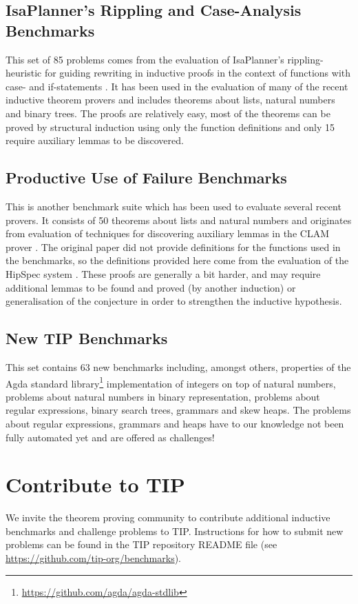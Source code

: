 \documentclass{llncs}
\begin{document}
\subsection{IsaPlanner's Rippling and Case-Analysis Benchmarks}
\label{sec:isap}
This set of 85 problems comes from the evaluation of IsaPlanner's rippling-heuristic for guiding rewriting in inductive proofs in the context of functions with case- and if-statements \cite{IsaPcase}. It has been used in the evaluation of many of the recent inductive theorem provers and includes theorems about lists, natural numbers and binary trees. The proofs are relatively easy, most of the theorems can be proved by structural induction using only the function definitions and only 15 require auxiliary lemmas to be discovered.

\subsection{Productive Use of Failure Benchmarks}
This is another benchmark suite which has been used to evaluate several recent provers. It consists of 50 theorems about lists and natural numbers and originates from evaluation of techniques for discovering auxiliary lemmas in the CLAM prover \cite{productiveuse}. The original paper did not provide definitions for the functions used in the benchmarks, so the definitions provided here come from the evaluation of the HipSpec system \cite{hipspecCADE}. These proofs are generally a bit harder, and may require additional lemmas to be found and proved (by another induction) or generalisation of the conjecture in order to strengthen the inductive hypothesis. 

\subsection{New TIP Benchmarks}
This set contains 63 new benchmarks including, amongst others,
properties of the Agda standard
library\footnote{\url{https://github.com/agda/agda-stdlib}}
implementation of integers on top of natural numbers, problems about natural numbers in binary representation, problems about regular expressions, binary search trees, grammars and skew heaps. The problems about regular expressions, grammars and heaps have to our knowledge not been fully automated yet and are offered as challenges!

\section{Contribute to TIP}
We invite the theorem proving community to contribute additional inductive benchmarks and challenge problems to TIP. Instructions for how to submit new problems can be found in the TIP repository README file (see \url{https://github.com/tip-org/benchmarks}).
\end{document}
